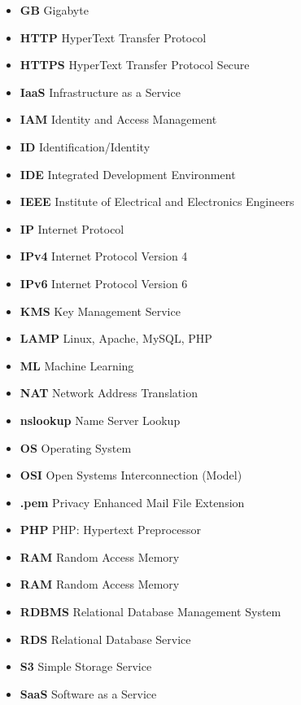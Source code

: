 \begin{itemize}
    \item  \textbf{GB} \textemdash Gigabyte
    \item  \textbf{HTTP} \textemdash HyperText Transfer Protocol
    \item  \textbf{HTTPS} \textemdash HyperText Transfer Protocol Secure
    \item  \textbf{IaaS} \textemdash Infrastructure as a Service
    \item  \textbf{IAM} \textemdash Identity and Access Management
    \item  \textbf{ID} \textemdash Identification/Identity
    \item  \textbf{IDE} \textemdash Integrated Development Environment
    \item  \textbf{IEEE} \textemdash Institute of Electrical and Electronics Engineers
    \item  \textbf{IP} \textemdash Internet Protocol
    \item  \textbf{IPv4} \textemdash Internet Protocol Version 4
    \item  \textbf{IPv6} \textemdash Internet Protocol Version 6
    \item  \textbf{KMS} \textemdash Key Management Service
    \item  \textbf{LAMP} \textemdash Linux, Apache, MySQL, PHP
    \item  \textbf{ML} \textemdash Machine Learning
    \item  \textbf{NAT} \textemdash Network Address Translation
    \item  \textbf{nslookup} \textemdash Name Server Lookup
    \item  \textbf{OS} \textemdash Operating System
    \item  \textbf{OSI} \textemdash Open Systems Interconnection (Model)
    \item  \textbf{.pem} \textemdash Privacy Enhanced Mail File Extension
    \item  \textbf{PHP} \textemdash PHP: Hypertext Preprocessor
    \item  \textbf{RAM} \textemdash Random Access Memory
    \item  \textbf{RAM} \textemdash Random Access Memory
    \item  \textbf{RDBMS} \textemdash Relational Database Management System
    \item  \textbf{RDS} \textemdash Relational Database Service
    \item  \textbf{S3} \textemdash Simple Storage Service
    \item  \textbf{SaaS} \textemdash Software as a Service

\end{itemize}
